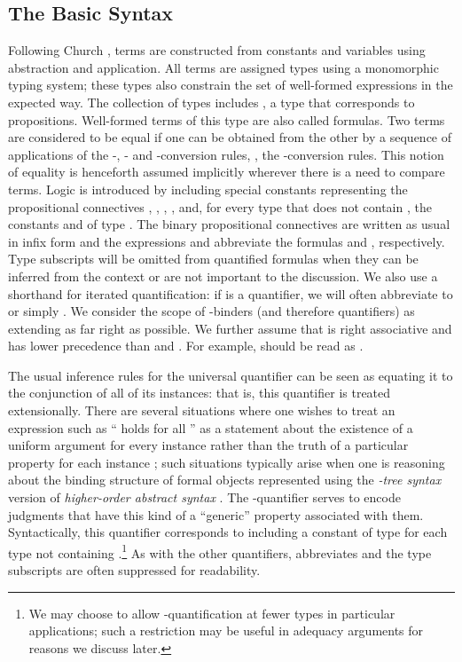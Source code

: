 \subsection{The Basic Syntax}

Following Church \cite{church40}, terms are constructed from constants
and variables using abstraction and application. All terms are
assigned types using a monomorphic typing system; these types also
constrain the set of well-formed expressions in the expected way. The
collection of types includes , a type that corresponds to
propositions. Well-formed terms of this type are also called formulas.
Two terms are considered to be equal if one can be obtained from the
other by a sequence of applications of the -, - and
-conversion rules, \ie, the -conversion rules. This
notion of equality is henceforth assumed implicitly wherever there is
a need to compare terms. Logic is introduced by including special
constants representing the propositional connectives , ,
, ,  and, for every type  that does not
contain , the constants  and  of type
. The binary propositional
connectives are written as usual in infix form and the expressions
 and  abbreviate the formulas
 and ,
respectively. Type subscripts will be omitted from quantified formulas
when they can be inferred from the context or are not important to the
discussion. We also use a shorthand for iterated quantification: if
 is a quantifier, we will often abbreviate  to  or simply
. We consider the scope of -binders (and
therefore quantifiers) as extending as far right as possible. We
further assume that  is right associative and has lower
precedence than  and . For example,  should be read as .

The usual inference rules for the universal quantifier can be seen as
equating it to the conjunction of all of its instances: that is, this
quantifier is treated extensionally.
There are several situations  where one
wishes to treat an expression such as `` holds for all
'' as a statement about the existence of a uniform argument for
every instance rather than the truth of a particular property for each
instance \cite{miller05tocl};
such situations typically arise when one is reasoning about the
binding structure of formal objects represented using the
{\em -tree syntax} \cite{miller00cl} version of {\em
higher-order abstract syntax} \cite{pfenning88pldi}.
The -quantifier serves to encode judgments that have this kind
of a ``generic'' property associated with them. Syntactically, this
quantifier corresponds to
including a constant  of type  for each type  not containing .\footnote{
We may choose to allow -quantification at fewer types in
particular applications; such a restriction may be
  useful in adequacy arguments for reasons we discuss later.}
As with the
other quantifiers,  abbreviates  and the type subscripts are often suppressed for readability.

